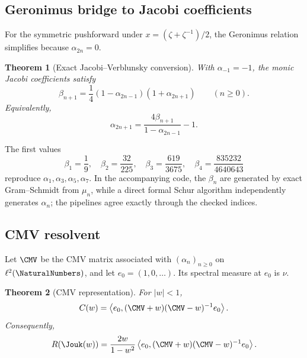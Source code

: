 \documentclass[11pt]{article}
\newtheorem{theorem}{Theorem}[section]
\theoremstyle{definition}
\theoremstyle{remark}
\begin{document}
\subsection{Geronimus bridge to Jacobi coefficients}

For the symmetric pushforward under \(x=(\zeta+\zeta^{-1})/2\), the Geronimus relation
simplifies because \(\alpha_{2n}=0\).

\begin{theorem}[Exact Jacobi--Verblunsky conversion]
\label{p7:thm:Geronimus}
With \(\alpha_{-1}=-1\), the monic Jacobi coefficients satisfy
\begin{equation}
 \boxed{\displaystyle
 \beta_{n+1}=\frac14(1-\alpha_{2n-1})(1+\alpha_{2n+1})}
 \qquad(n\ge0).
 \label{p7:eq:Geronimus}
\end{equation}
Equivalently,
\begin{equation}
 \alpha_{2n+1}=\frac{4\beta_{n+1}}{1-\alpha_{2n-1}}-1.
 \label{p7:eq:alpha-from-beta}
\end{equation}
\end{theorem}

The first values
\begin{equation}
 \beta_1=\frac19,\quad
 \beta_2=\frac{32}{225},\quad
 \beta_3=\frac{619}{3675},\quad
 \beta_4=\frac{835232}{4640643}
 \label{p7:eq:first-betas}
\end{equation}
reproduce \(\alpha_1,\alpha_3,\alpha_5,\alpha_7\). In the accompanying code, the
\(\beta_n\) are generated by exact Gram--Schmidt from \(\mu_n\), while a direct formal Schur
algorithm independently generates \(\alpha_n\); the pipelines agree exactly through the
checked indices.

\subsection{CMV resolvent}

Let \(\CMV\) be the CMV matrix associated with \((\alpha_n)_{n\ge0}\) on
\(\ell^2(\NaturalNumbers)\), and let \(e_0=(1,0,\ldots)\). Its spectral measure at \(e_0\) is \(\nu\).

\begin{theorem}[CMV representation]
\label{p7:thm:CMV}
For \(|w|<1\),
\begin{equation}
 C(w)=\left\langle e_0,(\CMV+w)(\CMV-w)^{-1}e_0\right\rangle.
 \label{p7:eq:C-CMV}
\end{equation}
Consequently,
\begin{equation}
 R(\Jouk(w))=\frac{2w}{1-w^2}
 \left\langle e_0,(\CMV+w)(\CMV-w)^{-1}e_0\right\rangle.
 \label{p7:eq:R-CMV}
\end{equation}
\end{theorem}
\end{document}
